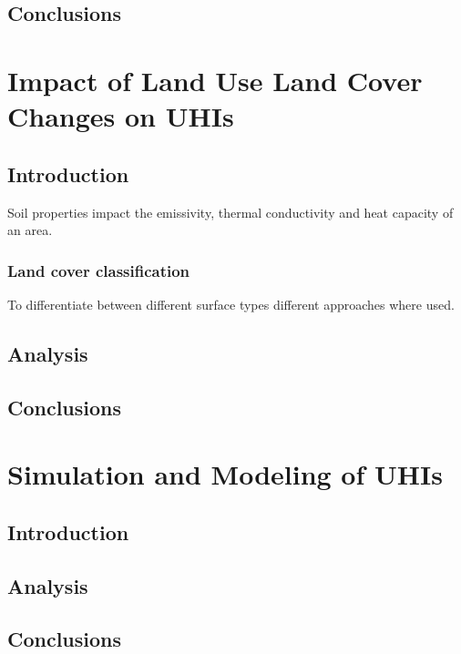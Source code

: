 \documentclass[a4paper, english]{article}
\begin{document}
    \subsection{Conclusions}

\section{Impact of Land Use Land Cover Changes on UHIs}
    \subsection{Introduction}
    Soil properties impact the emissivity, thermal conductivity and heat capacity of an area.
    \subsubsection{Land cover classification}
    To differentiate between different surface types different approaches where used. 
    


    \subsection{Analysis}
    \subsection{Conclusions}

\section{Simulation and Modeling of UHIs}
    \subsection{Introduction}
    \subsection{Analysis}
    \subsection{Conclusions}
\end{document}
